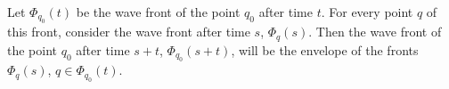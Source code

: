 Let $\Phi_{q_0}(t)$ be the wave front of the point $q_0$ after time $t$. For every point $q$ of this front, consider the wave front after time $s$, $\Phi_q(s)$. Then the wave front of the point $q_0$ after time $s + t$, $\Phi_{q_0}(s + t)$, will be the envelope of the fronts $\Phi_q(s)$, $q \in \Phi_{q_0}(t)$.
